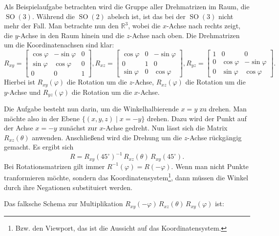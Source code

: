 \documentclass[a4paper,11pt,fleqn,twoside]{scrartcl}
\numberwithin{equation}{section}
\newcommand{\R}{\mathbb R}
\begin{document}
Als Beispielaufgabe betrachten wird die Gruppe aller Drehmatrizen
im Raum, die $\operatorname{SO}(3)$. Während die $\operatorname{SO}(2)$
abelsch ist, ist das bei der $\operatorname{SO}(3)$ nicht mehr
der Fall. Man betrachte nun den $\R^3$, wobei die $x$-Achse nach
rechts zeigt, die $y$-Achse in den Raum hinein und die $z$-Achse
nach oben. Die Drehmatrizen um die Koordinatenachsen sind klar:
\begin{equation}
R_{xy} = \begin{bmatrix}
\cos\varphi & -\sin\varphi & 0\\
\sin\varphi & \cos\varphi & 0\\
0 & 0 & 1
\end{bmatrix},
R_{xz} = \begin{bmatrix}
\cos\varphi & 0 & -\sin\varphi\\
0 & 1 & 0\\
\sin\varphi & 0 & \cos\varphi
\end{bmatrix},
R_{yz} = \begin{bmatrix}
1 & 0 & 0\\
0 & \cos\varphi & -\sin\varphi\\
0 & \sin\varphi & \cos\varphi
\end{bmatrix}.
\end{equation}
Hierbei ist $R_{xy}(\varphi)$ die Rotation um die $z$-Achse,
$R_{xz}(\varphi)$ die Rotation um die $y$-Achse und
$R_{yz}(\varphi)$ die Rotation um die $x$-Achse.

Die Aufgabe besteht nun darin, um die Winkelhalbierende $x=y$ zu
drehen. Man möchte also in der Ebene $\{(x,y,z)\mid x=-y\}$ drehen.
Dazu wird der Punkt auf der Achse $x=-y$ zunächst zur $x$-Achse
gedreht. Nun lässt sich die Matrix $R_{xz}(\theta)$ anwenden.
Anschließend wird die Drehung um die $z$-Achse rückgängig gemacht.
Es ergibt sich
\begin{equation}
R = R_{xy}(45^\circ)^{-1}\,R_{xz}(\theta)\,R_{xy}(45^\circ).
\end{equation}
Bei Rotationsmatrizen gilt immer $R^{-1}(\varphi)=R(-\varphi)$.
Wenn man nicht Punkte tranformieren möchte, sondern das
Koordinatensystem\footnote{Bzw. den Viewport, das ist die Aussicht
auf das Koordinatensystem.}, dann müssen die Winkel durch ihre
Negationen substituiert werden.

Das falksche Schema zur Multiplikation
$R_{xy}(-\varphi)\,R_{xz}(\theta)\,R_{xy}(\varphi)$ ist:
\end{document}
